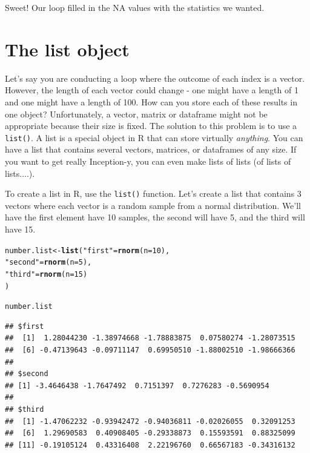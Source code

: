 \documentclass{tufte-book}\usepackage[]{graphicx}\usepackage[]{color}
\makeatletter
\newcommand{\hlnum}[1]{\textcolor[rgb]{0.686,0.059,0.569}{#1}}%
\newcommand{\hlstr}[1]{\textcolor[rgb]{0.192,0.494,0.8}{#1}}%
\newcommand{\hlstd}[1]{\textcolor[rgb]{0.345,0.345,0.345}{#1}}%
\newcommand{\hlkwb}[1]{\textcolor[rgb]{0.69,0.353,0.396}{#1}}%
\newcommand{\hlkwc}[1]{\textcolor[rgb]{0.333,0.667,0.333}{#1}}%
\newcommand{\hlkwd}[1]{\textcolor[rgb]{0.737,0.353,0.396}{\textbf{#1}}}%
\newenvironment{kframe}{%
 \def\at@end@of@kframe{}%
 \ifinner\ifhmode%
  \def\at@end@of@kframe{\end{minipage}}%
  \begin{minipage}{\columnwidth}%
 \fi\fi%
 \def\FrameCommand##1{\hskip\@totalleftmargin \hskip-\fboxsep
 \colorbox{shadecolor}{##1}\hskip-\fboxsep
     \hskip-\linewidth \hskip-\@totalleftmargin \hskip\columnwidth}%
 \MakeFramed {\advance\hsize-\width
   \@totalleftmargin\z@ \linewidth\hsize
   \@setminipage}}%
 {\par\unskip\endMakeFramed%
 \at@end@of@kframe}
\newenvironment{knitrout}{}{} %
\makeatother
\begin{document}
\begin{footnotesize}
Sweet! Our loop filled in the NA values with the statistics we wanted.

\section{The list object}

Let's say you are conducting a loop where the outcome of each index is a vector. However, the length of each vector could change - one might have a length of 1 and one might have a length of 100. How can you store each of these results in one object? Unfortunately, a vector, matrix or dataframe might not be appropriate because their size is fixed. The solution to this problem is to use a \texttt{list()}. A list is a special object in R that can store virtually \textit{anything}. You can have a list that contains several vectors, matrices, or dataframes of any size. If you want to get really Inception-y, you can even make lists of lists (of lists of lists....).

To create a list in R, use the \texttt{list()} function. Let's create a list that contains 3 vectors where each vector is a random sample from a normal distribution. We'll have the first element have 10 samples, the second will have 5, and the third will have 15.

\begin{knitrout}
\color{fgcolor}\begin{kframe}
\begin{alltt}
\hlstd{number.list} \hlkwb{<-} \hlkwd{list}\hlstd{(}\hlstr{"first"} \hlstd{=} \hlkwd{rnorm}\hlstd{(}\hlkwc{n} \hlstd{=} \hlnum{10}\hlstd{),}
     \hlstr{"second"} \hlstd{=} \hlkwd{rnorm}\hlstd{(}\hlkwc{n} \hlstd{=} \hlnum{5}\hlstd{),}
     \hlstr{"third"} \hlstd{=} \hlkwd{rnorm}\hlstd{(}\hlkwc{n} \hlstd{=} \hlnum{15}\hlstd{)}
\hlstd{)}

\hlstd{number.list}
\end{alltt}
\begin{verbatim}
## $first
##  [1]  1.28044230 -1.38974668 -1.78883875  0.07580274 -1.28073515
##  [6] -0.47139643 -0.09711147  0.69950510 -1.88002510 -1.98666366
## 
## $second
## [1] -3.4646438 -1.7647492  0.7151397  0.7276283 -0.5690954
## 
## $third
##  [1] -1.47062232 -0.93942472 -0.94036811 -0.02026055  0.32091253
##  [6]  1.29690583  0.40908405 -0.29338873  0.15593591  0.88325099
## [11] -0.19105124  0.43316408  2.22196760  0.66567183 -0.34316132
\end{verbatim}
\end{kframe}
\end{knitrout}


\end{footnotesize}
\end{document}
